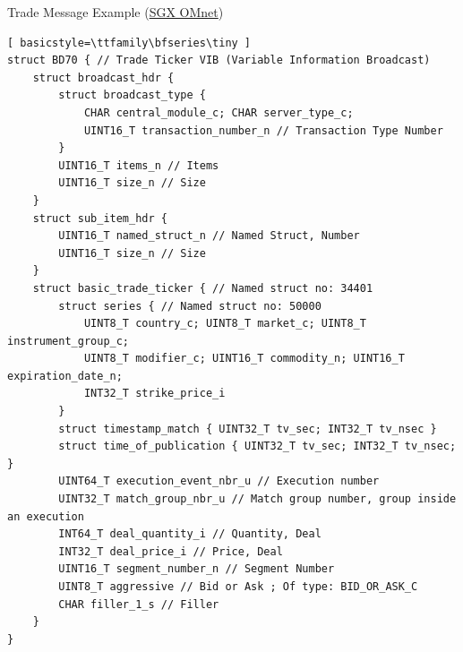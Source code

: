 \documentclass{beamer}
\begin{document}
\begin{frame}[fragile]{Trade Message Example (\href{https://api2.sgx.com/sites/default/files/2026-06/OMnet_MessRef_SGX_va42.pdf}{SGX OMnet})}
\begin{lstlisting}[ basicstyle=\ttfamily\bfseries\tiny ]
struct BD70 { // Trade Ticker VIB (Variable Information Broadcast)
	struct broadcast_hdr {
		struct broadcast_type {
			CHAR central_module_c; CHAR server_type_c;
			UINT16_T transaction_number_n // Transaction Type Number
		}
		UINT16_T items_n // Items
		UINT16_T size_n // Size
	}
	struct sub_item_hdr {
		UINT16_T named_struct_n // Named Struct, Number
		UINT16_T size_n // Size
	}
	struct basic_trade_ticker { // Named struct no: 34401
		struct series { // Named struct no: 50000
			UINT8_T country_c; UINT8_T market_c; UINT8_T instrument_group_c;
			UINT8_T modifier_c; UINT16_T commodity_n; UINT16_T expiration_date_n;
			INT32_T strike_price_i
		}
		struct timestamp_match { UINT32_T tv_sec; INT32_T tv_nsec }
		struct time_of_publication { UINT32_T tv_sec; INT32_T tv_nsec; }
		UINT64_T execution_event_nbr_u // Execution number
		UINT32_T match_group_nbr_u // Match group number, group inside an execution
		INT64_T deal_quantity_i // Quantity, Deal
		INT32_T deal_price_i // Price, Deal
		UINT16_T segment_number_n // Segment Number
		UINT8_T aggressive // Bid or Ask ; Of type: BID_OR_ASK_C
		CHAR filler_1_s // Filler
	}
}
\end{lstlisting}
\end{frame}
\end{document}
